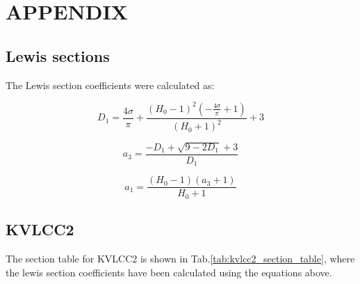 \section*{APPENDIX}\label{appendix}

    \subsection*{Lewis sections}\label{lewis-sections}

    The Lewis section coefficients were calculated as:
 
            
    
    \begin{equation}
D_{1} = \frac{4 \sigma}{\pi} + \frac{\left(H_{0} - 1\right)^{2} \left(- \frac{4 \sigma}{\pi} + 1\right)}{\left(H_{0} + 1\right)^{2}} + 3
\label{eq:D_1}
\end{equation}

    
 
            
    
    \begin{equation}
a_{3} = \frac{- D_{1} + \sqrt{9 - 2 D_{1}} + 3}{D_{1}}
\label{eq:a_3}
\end{equation}

    
 
            
    
    \begin{equation}
a_{1} = \frac{\left(H_{0} - 1\right) \left(a_{3} + 1\right)}{H_{0} + 1}
\label{eq:a_1}
\end{equation}

    

    \subsection*{KVLCC2}\label{kvlcc2}

 The section table for KVLCC2 is shown in
Tab.\ref{tab:kvlcc2_section_table}, where the lewis section
coefficients have been calculated using the equations above.

    
 
            
    
